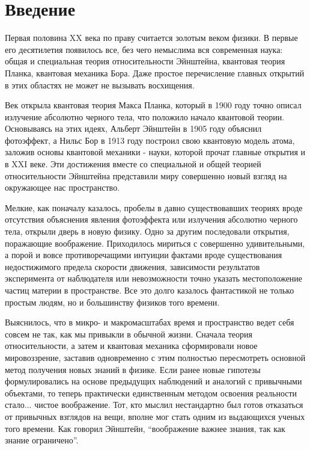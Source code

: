 \chapter*{Введение}


Первая половина XX века по праву считается золотым веком физики.
В первые его десятилетия появилось все, без чего немыслима вся современная наука: общая и специальная теория относительности Эйнштейна, квантовая теория Планка, квантовая механика Бора.
Даже простое перечисление главных открытий в этих областях не может не вызывать восхищения.

Век открыла квантовая теория Макса Планка, который в 1900 году точно описал излучение абсолютно черного тела, что положило начало квантовой теории.
Основываясь на этих идеях, Альберт Эйнштейн в 1905 году объяснил фотоэффект, а Нильс Бор в 1913 году построил свою квантовую модель атома, заложив основы квантовой механики - науки, которой прочат главные открытия и в XXI веке.
Эти достижения вместе со специальной и общей теорией относительности Эйнштейна представили миру совершенно новый взгляд на окружающее нас пространство. 

Мелкие, как поначалу казалось, пробелы в давно существовавших теориях вроде отсутствия объяснения явления фотоэффекта или излучения абсолютно черного тела, открыли дверь в новую физику.
Одно за другим последовали открытия, поражающие воображение. 
Приходилось мириться с совершенно удивительными, а порой и вовсе противоречащими интуиции фактами вроде существования недостижимого предела скорости движения, зависимости результатов эксперимента от наблюдателя или невозможности точно указать местоположение частиц материи в пространстве.
Все это долго казалось фантастикой не только простым людям, но и большинству физиков того времени.

Выяснилось, что в микро- и макромасштабах время и пространство ведет себя совсем не так, как мы привыкли в обычной жизни.
Сначала теория относительности, а затем и квантовая механика сформировали новое мировоззрение, заставив одновременно с этим полностью пересмотреть основной метод получения новых знаний в физике.
Если ранее новые гипотезы формулировались на основе предыдущих наблюдений и аналогий с привычными объектами, то теперь практически единственным методом освоения реальности стало... чистое воображение.
Тот, кто мыслил нестандартно был готов отказаться от привычных взглядов на вещи, вполне мог стать одним из выдающихся ученых того времени.
Как говорил Эйнштейн, ``воображение важнее знания, так как знание ограничено''.

